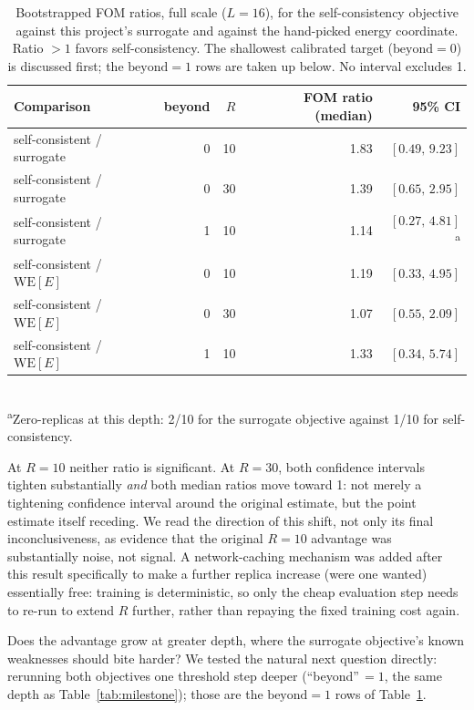 \documentclass[a4paper,fleqn]{cas-sc}
\begin{document}
\begin{table}[H]
\centering\small
\caption{Bootstrapped FOM ratios, full scale ($L=16$), for the self-consistency objective
	against this project's surrogate and against the hand-picked energy coordinate. Ratio
	$>1$ favors self-consistency. The shallowest calibrated target
	($\mathrm{beyond}=0$) is discussed first; the $\mathrm{beyond}=1$ rows are taken up
	below. No interval excludes 1.}
\label{tab:kimcaiboot}
\begin{tabular}{lrrrr}
	\toprule
	Comparison & beyond & $R$ & FOM ratio (median) & 95\% CI \\
	\midrule
	self-consistent / surrogate & 0 & 10 & 1.83 & $[0.49,\,9.23]$ \\
	self-consistent / surrogate & 0 & 30 & 1.39 & $[0.65,\,2.95]$ \\
	self-consistent / surrogate & 1 & 10 & 1.14 & $[0.27,\,4.81]$\textsuperscript{a} \\
	self-consistent / $\mathrm{WE}[E]$ & 0 & 10 & 1.19 & $[0.33,\,4.95]$ \\
	self-consistent / $\mathrm{WE}[E]$ & 0 & 30 & 1.07 & $[0.55,\,2.09]$ \\
	self-consistent / $\mathrm{WE}[E]$ & 1 & 10 & 1.33 & $[0.34,\,5.74]$ \\
	\bottomrule
\end{tabular}
\\[2pt]
{\footnotesize\textsuperscript{a}Zero-replicas at this depth: 2/10 for the surrogate
	objective against 1/10 for self-consistency.}
\end{table}

At $R=10$ neither ratio is significant. At $R=30$, both confidence intervals tighten
substantially \emph{and} both median ratios move toward 1: not merely a tightening
confidence interval around the original estimate, but the point estimate itself receding.
We read the direction of this shift, not only its final inconclusiveness, as evidence that
the original $R=10$ advantage was substantially noise, not signal. A network-caching
mechanism was added after this result specifically to make a further replica increase (were
one wanted) essentially free: training is deterministic, so only the cheap evaluation step
needs to re-run to extend $R$ further, rather than repaying the fixed training cost again.

Does the advantage grow at greater depth, where the surrogate objective's known
	weaknesses should bite harder? We tested the natural next question directly: rerunning
both objectives one threshold step deeper (``beyond''\,$=1$, the same depth as
Table~\ref{tab:milestone}); those are the $\mathrm{beyond}=1$ rows of
Table~\ref{tab:kimcaiboot}.
\end{document}
